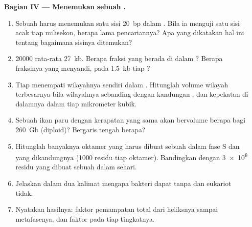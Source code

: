 \begin{problem}
\medskip
\noindent\textbf{Bagian IV --- Menemukan sebuah .}
\begin{enumerate}[resume]
  \item Sebuah  harus menemukan satu sisi \qty{20}{bp} dalam
        . Bila ia menguji satu sisi acak tiap milisekon, berapa
        lama pencariannya? Apa yang dikatakan hal ini tentang bagaimana
        sisinya ditemukan?
  \item \qty{20000}{}   rata-rata \qty{27}{kb}. Berapa
        fraksi  yang berada di dalam ? Berapa fraksinya yang
        menyandi, pada \qty{1.5}{kb}  tiap ?
  \item Tiap  menempati wilayahnya sendiri dalam .
        Hitunglah volume wilayah  terbesarnya bila wilayahnya
        sebanding dengan kandungan , dan kepekatan  di
        dalamnya dalam  tiap mikrometer kubik.
  \item Sebuah  ikan paru dengan kerapatan  yang sama akan
        bervolume berapa bagi \qty{260}{Gb} (diploid)? Bergaris tengah
        berapa?
  \item Hitunglah banyaknya oktamer  yang harus dibuat sebuah 
        dalam fase S dan  yang dikandungnya (\qty{1000}{}
        residu tiap oktamer). Bandingkan dengan \qty{3e9}{} residu
         yang dibuat sebuah  dalam sehari.
  \item Jelaskan dalam dua kalimat mengapa bakteri dapat tanpa
         dan eukariot tidak.
  \item Nyatakan hasilnya: faktor pemampatan total dari heliksnya
        sampai  metafasenya, dan faktor pada tiap tingkatnya.
\end{enumerate}
\end{problem}
